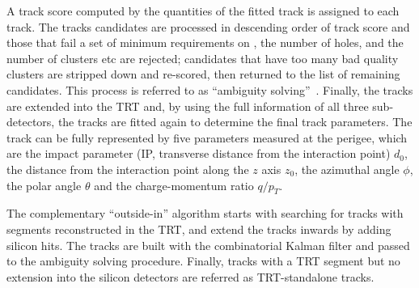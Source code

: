 A track score computed by the quantities of the fitted track
is assigned to each track.
The tracks candidates are processed in descending order of 
track score and those that fail 
a set of minimum requirements on \pt, the number of holes, 
and the number of clusters etc are rejected;
candidates that have too many bad quality clusters are 
stripped down and re-scored, then returned to the list
of remaining candidates.
This process is referred to as ``ambiguity solving''~\cite{PERF-2015-08}.
Finally, the tracks are extended into the TRT and, by using the full information
of all three sub-detectors, the tracks are fitted again to determine the final track
parameters. The track can be fully represented 
by five parameters measured at the perigee,
which are the impact parameter 
(IP, transverse distance from the interaction point) $d_0$, 
the distance from the interaction point along the $z$ axis $z_0$,
the azimuthal angle $\phi$, the polar angle $\theta$ 
and the charge-momentum ratio $q/p_T$.

The complementary ``outside-in'' algorithm starts with searching for tracks with segments 
reconstructed in the TRT, and extend the tracks inwards by adding silicon hits.
The tracks are built with the combinatorial Kalman filter and passed to the
ambiguity solving procedure.
Finally, tracks with a TRT segment but no extension into the silicon detectors
are referred as TRT-standalone tracks. 

